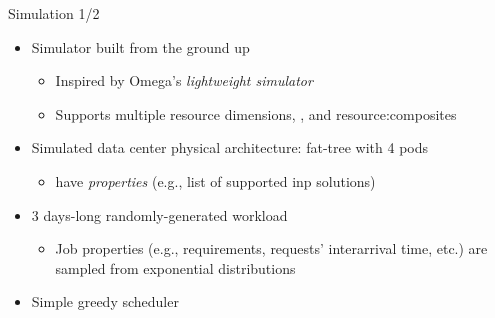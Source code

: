 \begin{frame}{Simulation 1/2}

    \setcounter{footnote}{0}

    \begin{itemize}
        \item Simulator built from the ground up %
        \begin{itemize}
            \item Inspired by Omega's\footnotemark{} \textit{lightweight simulator}\footnotemark{}
            \item Supports multiple resource dimensions, , and \glspl{resource:composite}
        \end{itemize}
        \item Simulated data center physical architecture: fat-tree with 4 pods
        \begin{itemize}
            \item {} have \textit{properties} (e.g., list of supported \gls*{inp} solutions)
        \end{itemize}
        \item 3 days-long randomly-generated workload
        \begin{itemize}
            \item Job properties (e.g., requirements, requests' interarrival time, etc.) are sampled from exponential distributions %
        \end{itemize}
        \item Simple greedy scheduler
    \end{itemize}

    \setcounter{footnote}{1}
\end{frame}

